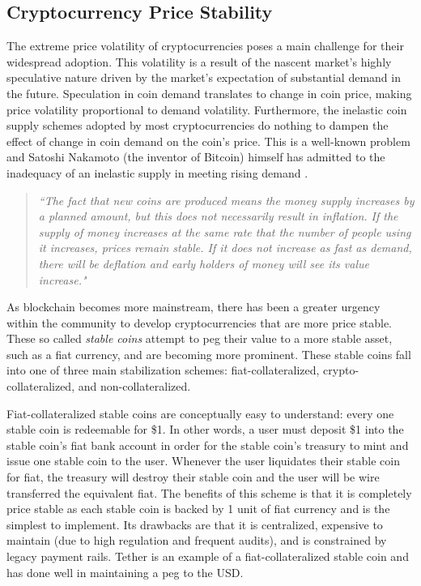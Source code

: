 \subsection{Cryptocurrency Price Stability}
The extreme price volatility of cryptocurrencies poses a main challenge for their widespread adoption. This volatility is a result of the nascent market's highly speculative nature driven by the market's expectation of substantial demand in the future. Speculation in coin demand translates to change in coin price, making price volatility proportional to demand volatility. Furthermore, the inelastic coin supply schemes adopted by most cryptocurrencies do nothing to dampen the effect of change in coin demand on the coin's price. This is a well-known problem and Satoshi Nakamoto (the inventor of Bitcoin) himself has admitted to the inadequacy of an inelastic supply in meeting rising demand \cite{Satoshi08}.
%
\begin{framed}
\begin{quote}
\textit{``The fact that new coins are produced means the money supply increases by a planned amount, but this does not necessarily result in inflation. If the supply of money increases at the same rate that the number of people using it increases, prices remain stable. If it does not increase as fast as demand, there will be deflation and early holders of money will see its value increase."}
\end{quote}
\end{framed}

As blockchain becomes more mainstream, there has been a greater urgency within the community to develop cryptocurrencies that are more price stable. These so called \textit{stable coins} attempt to peg their value to a more stable asset, such as a fiat currency, and are becoming more prominent. These stable coins fall into one of three main stabilization schemes: fiat-collateralized, crypto-collateralized, and non-collateralized. 

Fiat-collateralized stable coins are conceptually easy to understand: every one stable coin is redeemable for \$1. In other words, a user must deposit \$1 into the stable coin's fiat bank account in order for the stable coin's treasury to mint and issue one stable coin to the user. Whenever the user liquidates their stable coin for fiat, the treasury will destroy their stable coin and the user will be wire transferred the equivalent fiat. The benefits of this scheme is that it is completely price stable as  each stable coin is backed by 1 unit of fiat currency and is the simplest to implement. Its drawbacks are that it is centralized, expensive to maintain (due to high regulation and frequent audits), and is constrained by legacy payment rails. Tether \cite{Tether16} is an example of a fiat-collateralized stable coin and has done well in maintaining a peg to the USD.

